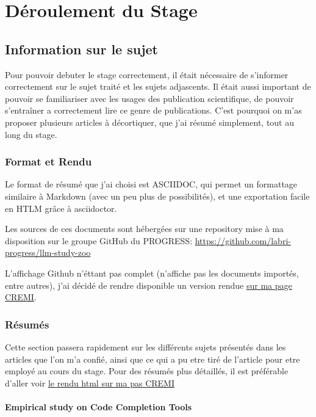 \chapter{Déroulement du Stage}
\label{main}


\section{Information sur le sujet}

Pour pouvoir debuter le stage correctement, il était nécessaire de s'informer correctement sur le sujet traité et les sujets adjascents.
Il était aussi important de pouvoir se familiariser avec les usages des publication scientifique, de pouvoir s'entraîner a correctement
lire ce genre de publications.
C'est pourquoi on m'as proposer plusieurs articles à décortiquer, que j'ai résumé simplement, tout au long du stage.

\subsection{Format et Rendu}

Le format de résumé que j'ai choisi est ASCIIDOC, qui permet un formattage similaire à Markdown (avec un peu plus de possibilités), et une exportation facile en HTLM grâce à asciidoctor.

Les sources de ces documents sont hébergées sur une repository mise à ma disposition sur le groupe GitHub du PROGRESS:
\url{https://github.com/labri-progress/llm-study-zoo}

L'affichage Github n'éttant pas complet (n'affiche pas les documents importés, entre autres), j'ai décidé de rendre disponible un version rendue
\href{https://maxime-pico.emi.u-bordeaux.fr/stage-labri/llm-study-zoo/}{sur ma page CREMI}.


\subsection{Résumés}

Cette section passera rapidement sur les différents sujets présentés dans les articles que l'on m'a confié, ainsi que ce qui a pu etre tiré de l'article pour etre employé au cours du stage.
Pour des résumés plus détaillés, il est préférable d'aller voir \href{https://maxime-pico.emi.u-bordeaux.fr/stage-labri/llm-study-zoo/}{le rendu html sur ma pas CREMI}


\subsubsection{Empirical study on Code Completion Tools \cite{evalcodecompquality}}

